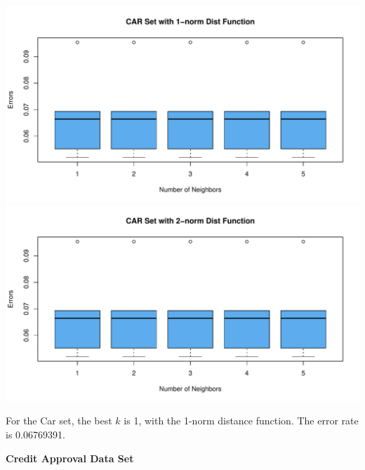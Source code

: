 \documentclass{article}
\begin{document}
\begin{center}
  \includegraphics[width=0.9\linewidth]{Images/Prob2/Prob2-2-Car-1norm.pdf}
  \includegraphics[width=0.9\linewidth]{Images/Prob2/Prob2-2-Car-2norm.pdf}
\end{center}

For the Car set, the best $k$ is 1, with the 1-norm distance function. The error rate is 0.06769391.

\bigskip\bigskip

\begin{center}
    \textcolor{mydarkgreen}{\textbf{\textsf{Credit Approval Data Set}}}
\end{center}
\end{document}
